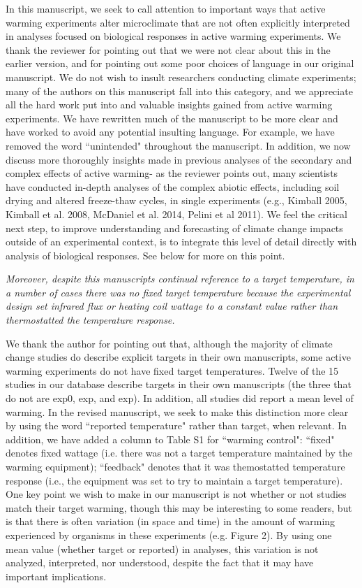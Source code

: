 \documentclass[11pt,a4paper]{letter}
\begin{document}
In this manuscript, we seek to call attention to important ways that active warming experiments alter microclimate that are not often explicitly interpreted in analyses focused on biological responses in active warming experiments. We thank the reviewer for pointing out that we were not clear about this in the earlier version, and for pointing out some poor choices of language in our original manuscript. We do not wish to insult researchers conducting climate experiments; many of the authors on this manuscript fall into this category, and we appreciate all the hard work put into and valuable insights gained from active warming experiments. We have rewritten much of the manuscript to be more clear and have worked to avoid any potential insulting language. For example, we have removed the word ``unintended" throughout the manuscript. In addition, we now discuss more thoroughly insights made in previous analyses of the secondary and complex effects of active warming- as the reviewer points out, many scientists have conducted in-depth analyses of the complex abiotic effects, including soil drying and altered freeze-thaw cycles, in single experiments (e.g., Kimball 2005, Kimball et al. 2008, McDaniel et al. 2014, Pelini et al 2011). We feel the critical next step, to improve understanding and  forecasting of climate change impacts outside of an experimental context, is to integrate this level of detail directly with analysis of biological responses. See below for more on this point. 

\par \emph{Moreover, despite this manuscripts continual reference to a target temperature, in a number of cases there  was no fixed target temperature because the experimental design set infrared flux or heating coil wattage to a constant value rather than thermostatted the temperature response.}
\par We thank the author for pointing out that, although the majority of climate change studies do describe explicit targets in their own manuscripts, some active warming experiments do not have fixed target temperatures. Twelve of the 15 studies in our database describe targets in their own manuscripts (the three that do not are exp0, exp, and exp). In addition, all studies did report a mean level of warming. In the revised manuscript, we seek to make this distinction  more clear by  using the word ``reported temperature" rather than target, when relevant. In addition, we have added a column to Table S1 for ``warming control": ``fixed" denotes fixed wattage (i.e. there was not a target temperature maintained by the warming equipment); ``feedback" denotes that it was themostatted temperature response (i.e., the equipment was set to try to maintain a target temperature). One key point we wish to make in our manuscript is not whether or not studies match their target warming, though this may be interesting to some readers, but is that there is often variation (in space and time) in the amount of warming experienced by organisms in these experiments (e.g. Figure 2). By using one mean value (whether target or reported) in analyses, this variation is not analyzed, interpreted, nor understood, despite the fact that it may have important implications.
\end{document}
